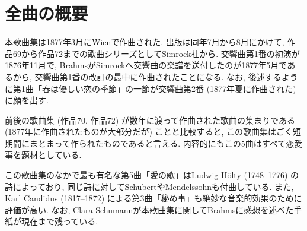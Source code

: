 
\section*{全曲の概要}

本歌曲集は1877年3月にWienで作曲された\cite{library}\cite{denki}. 出版は同年7月から8月にかけて, 作品69から作品72までの歌曲シリーズとしてSimrock社から\cite{cd}. 
交響曲第1番の初演が1876年11月で, BrahmsがSimrockへ交響曲の楽譜を送付したのが1877年5月であるから,
交響曲第1番の改訂の最中に作曲されたことになる.
なお, 後述するように第1曲「春は優しい恋の季節」の一節が交響曲第2番 (1877年夏に作曲された) に顔を出す.

前後の歌曲集 (作品70, 作品72) が数年に渡って作曲された歌曲の集まりである (1877年に作曲されたものが大部分だが) こと\cite{taiyaku}と比較すると,
この歌曲集はごく短期間にまとまって作られたものであると言える.
内容的にもこの5曲はすべて恋愛事を題材としている.

この歌曲集のなかで最も有名な第5曲「愛の歌」はLudwig Hölty (1748--1776) の詩によっており,
同じ詩に対してSchubertやMendelssohnも付曲している.
また, Karl Candidus (1817--1872) による第3曲「秘め事」も絶妙な音楽的効果のために評価が高い.
なお, Clara Schumannが本歌曲集に関してBrahmsに感想を述べた手紙が現在まで残っている\cite{clara}.
